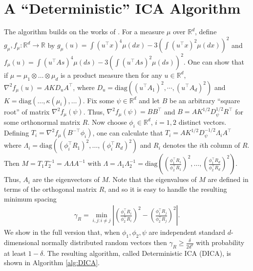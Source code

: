 \documentclass{article} %
\newcommand{\R}{\mathbb{R}}
\newcommand{\real}{\mathbb{R}}
\newcommand{\E}{\mathbb{E}}
\theoremstyle{definition}
\begin{document}
\section{A ``Deterministic'' ICA Algorithm}
\label{sec:DICA}
The algorithm builds on the works of \citet{frieze1996learning,hsu2013learning,arora2012provable}.
For a measure $\mu$ over $\real^d$, define
 $g_\mu, f_\mu:\real^d \to \real$ by
$g_\mu(u) = \int (u^\top x)^4 \mu(dx) - 3 (\int (u^\top x)^2 \mu(dx) )^2$
and
 $f_\mu(u) = \int (u^\top A s)^4 \mu(ds) - 3 (\int (u^\top As)^2 \mu(ds) )^2$. 
One can show that if $\mu = \mu_1\otimes \dots \otimes \mu_d$ is a product measure then for any $u\in \R^d$,
$\nabla^2 f_\mu(u)=A K D_{u} A^\top$,
	where $D_{u} =\text{diag}\left((u^{\top}A_1)^2,\cdots, (u^{\top}A_d)^2\right)$
	and $K = \text{diag}( \dots, \kappa(\mu_i), \dots)$.
Fix some $\psi\in \R^d$ and let $B$ be an arbitrary ``square root'' of matrix $\nabla^2 f_\mu(\psi)$. Thus, $\nabla^2 f_\mu(\psi)= B B^\top$ and
	$B= AK^{1/2}D_{\psi}^{1/2}R^{\top}$ for some orthonormal matrix $R$.
Now choose $\phi_i\in \R^d$, $i=1,2$ distinct vectors.
Defining $T_i=\nabla^2 f_\mu(B^{-\top} \phi_i)$, one can calculate that
$T_i=A K^{1/2} D_\psi^{-1/2} \Lambda_i A^\top$ where $\Lambda_i =\text{diag}\left( (\phi_i^\top R_1)^2,\ldots,(\phi_i^\top R_d)^2 \right)$ and $R_i$ denotes the $i$th column of $R$.
Then $M=T_1 T_2^{-1} = A\Lambda A^{-1}$ with $\Lambda=\Lambda_1 \Lambda_2^{-1}=\text{diag}\left( \left(\frac{\phi_1^\top R_1}{\phi_2^\top R_1}\right)^2,\ldots,\left(\frac{\phi_1^\top R_d}{\phi_2^\top R_d}\right)^2 \right)$. Thus, $A_i$ are the eigenvectors of $M$.
Note that the eigenvalues of $M$ are defined in terms of the orthogonal matrix $R$,
and so it is easy to handle the resulting minimum spacing
\begin{align*}
\gamma_R =  \min_{i,j: i\neq j} \left\vert \left(\frac{\phi_1^{\top}R_i}{\phi_2^{\top}R_i}\right)^2 - \left(\frac{\phi_1^{\top}R_j}{\phi_2^{\top}R_j}\right)^2 \right\vert.
\end{align*}
We show in the full version \citep{HuGySz15} %
that,  when $\phi_1,\phi_2,\psi$ are independent standard $d$-dimensional normally distributed random vectors then
 $\gamma_R \ge\frac{\delta}{2d^2}$ with probability at least $1-\delta$.
The resulting algorithm, called Deterministic ICA (DICA), is shown in Algorithm \ref{alg:DICA}. 
\end{document}
